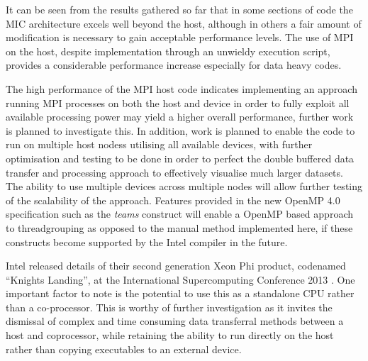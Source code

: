 \documentclass[runningheads,a4paper]{llncs}
\begin{document}
It can be seen from the results gathered so far that in some sections of code the MIC architecture excels well beyond the host, 
although in others a fair amount of modification is necessary to gain acceptable performance levels. The use of MPI on the host, 
despite implementation through an unwieldy execution script, provides a considerable performance increase especially for data heavy 
codes. 

The high performance of the MPI host code indicates implementing an approach running MPI processes on both the host and device 
in order to fully exploit all available processing power may yield a higher overall performance, further work is planned to investigate this.
In addition, work is planned to enable the code to run on multiple host nodess utilising all available devices, with further optimisation and 
testing to be done in order to perfect the double buffered data transfer and processing approach to effectively visualise much larger 
datasets. The ability to use multiple devices across multiple nodes will allow further testing of the scalability of the approach. 
Features provided in the new OpenMP 4.0 specification such as the \textit{teams} construct will enable a OpenMP based approach to 
threadgrouping as opposed to the manual method implemented here, if these constructs become supported by the Intel compiler in the future. 

Intel released details of their second generation Xeon Phi product, codenamed “Knights Landing”,  at the International Supercomputing 
Conference 2013 \cite{knightlanding}. One important factor to note is the potential to use this as a standalone CPU rather than a co-processor. 
This is worthy of further investigation as it invites the dismissal of complex and time consuming data transferral methods between 
a host and coprocessor, while retaining the ability to run directly on the host rather than copying executables to an external device.
 

\end{document}
